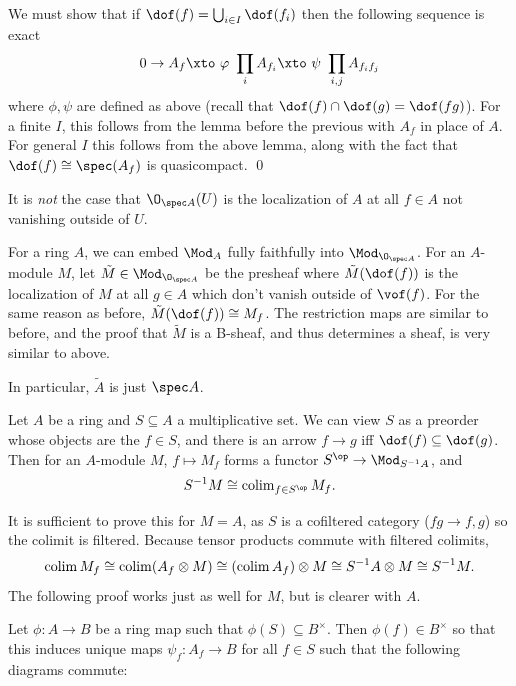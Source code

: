 \ethrm

\bproof

    We must show that if $\dof(f)=\bigcup_{i\in I}\dof(f_i)$ then the following sequence is exact
    $$ 0 \to A_f \xtos\phi \prod_iA_{f_i} \xtos\psi \prod_{i,j}A_{f_if_j} $$
    where $\phi,\psi$ are defined as above (recall that $\dof(f)\cap\dof(g)=\dof(fg)$).
    For a finite $I$, this follows from the lemma before the previous with $A_f$ in place of $A$.
    For general $I$ this follows from the above lemma, along with the fact that $\dof(f)\cong\spec(A_f)$ is quasicompact.
    \qed

\eproof

\bnote

    It is {\it not\/} the case that $\O_{\spec A}(U)$ is the localization of $A$ at all $f\in A$ not vanishing outside of $U$.

\enote

For a ring $A$, we can embed $\Mod_A$ fully faithfully into $\Mod_{\O_{\spec A}}$.
For an $A$-module $M$, let $\tilde M\in\Mod_{\O_{\spec A}}$ be the presheaf where $\tilde M(\dof(f))$ is the localization of $M$ at all $g\in A$ which don't vanish outside
of $\vof(f)$.
For the same reason as before, $\tilde M(\dof(f))\cong M_f$.
The restriction maps are similar to before, and the proof that $\tilde M$ is a B-sheaf, and thus determines a sheaf, is very similar to above.

In particular, $\tilde A$ is just $\spec A$.

\blemm

    Let $A$ be a ring and $S\subseteq A$ a multiplicative set.
    We can view $S$ as a preorder whose objects are the $f\in S$, and there is an arrow $f\to g$ iff $\dof(f)\subseteq\dof(g)$.
    Then for an $A$-module $M$, $f\mapsto M_f$ forms a functor $S^\op\to\Mod_{S^{-1}A}$, and
    $$ S^{-1}M \cong \colim_{f\in S^\op}M_f . $$

\elemm

\bproof

    It is sufficient to prove this for $M=A$, as $S$ is a cofiltered category ($fg\to f,g$) so the colimit is filtered.
    Because tensor products commute with filtered colimits,
    $$ \mathop{\rm colim}\nolimits M_f \cong \mathop{\rm colim}\nolimits(A_f\otimes M) \cong (\mathop{\rm colim}\nolimits A_f)\otimes M \cong S^{-1}A\otimes M \cong S^{-1}M . $$
    The following proof works just as well for $M$, but is clearer with $A$.

    Let $\phi\colon A\to B$ be a ring map such that $\phi(S)\subseteq B^\times$.
    Then $\phi(f)\in B^\times$ so that this induces unique maps $\psi_f\colon A_f\to B$ for all $f\in S$ such that the following diagrams commute:

